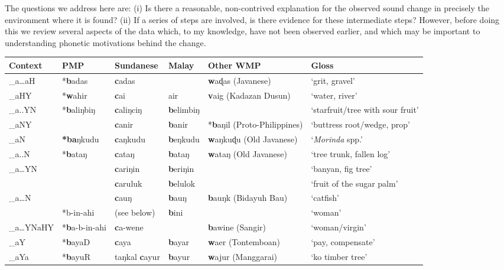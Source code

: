 \documentclass[output=paper]{langscibook}
\begin{document}
The questions we address here are: (i) Is there a reasonable, non-contrived explanation for the observed sound change in precisely the environment where it is found? (ii) If a series of steps are involved, is there evidence for these intermediate steps? However, before doing this we review several aspects of the data which, to my knowledge, have not been observed earlier, and which may be important to understanding phonetic motivations behind the change.

\begin{sidewaystable}
\small
\begin{tabularx}{\textwidth}{llllll}
\lsptoprule
{Context} & {PMP} & {Sundanese} & {Malay} & {Other} {WMP} & {Gloss}\\
\midrule
\_a…aH & *\textbf{b}adas & \textbf{c}adas &  & \textbf{w}aɖas (Javanese) & ‘grit, gravel’\\
\_aHY & *\textbf{w}ahir & \textbf{c}ai & air & \textbf{v}aig (Kadazan Dusun) & ‘water, river’\\
\_a..YN & *\textbf{b}aliŋbiŋ & \textbf{c}aliŋciŋ & \textbf{b}elimbiŋ &  & ‘starfruit/tree with sour fruit’\\
\_aNY &  & \textbf{c}anir & \textbf{b}anir & *\textbf{b}aŋil  (Proto-Philippines) & ‘buttress root/wedge, prop’\\
\_aN & \textbf{*ba}ŋkudu & \textbf{c}aŋkudu & \textbf{b}eŋkudu & \textbf{w}aŋkuɖu   (Old Javanese) & ‘\textit{Morinda} spp.’\\
\_a..N & *\textbf{b}ataŋ & \textbf{c}ataŋ & \textbf{b}ataŋ & \textbf{w}ataŋ   (Old Javanese) & ‘tree trunk, fallen log’\\
\_a…YN &  & \textbf{c}ariŋin & \textbf{b}eriŋin\footnotemark{} &  & ‘banyan, fig tree’\\
&  & \textbf{c}aruluk & \textbf{b}elulok\footnotemark{} &  & ‘fruit of the sugar palm’\\
\_a…N &  & \textbf{c}auŋ & \textbf{b}auŋ\footnotemark{} & \textbf{b}auŋk (Bidayuh Bau) & ‘catfish’\\
& *b-in-ahi & (see below) & \textbf{b}ini &  & ‘woman’\\
\_a…YNaHY & *\textbf{b}a-b-in-ahi & \textbf{c}a-wene &  & \textbf{b}awine (Sangir) & ‘woman/virgin’\\
\_aY & *\textbf{b}ayaD & \textbf{c}aya & \textbf{b}ayar & \textbf{w}aer  (Tontemboan) & ‘pay, compensate’\\
\_aYa & *\textbf{b}ayuR & taŋkal \textbf{c}ayur & \textbf{b}ayur & \textbf{w}ajur  (Manggarai) & ‘ko timber tree’\\

\end{tabularx}
\end{sidewaystable}
\end{document}
